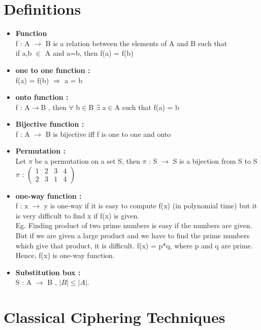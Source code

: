 \documentclass[11pt]{article}
\begin{document}
\section{Definitions}

\begin{itemize}
    \item \textbf{Function}\\
    f : A $\rightarrow$ B is a relation between the elements of A and B such that \\
    if a,b $\in$ A and a=b, then f(a) = f(b)
    \item \textbf{one to one function :}\\
    f(a) = f(b) $\Rightarrow$ a = b
    \item \textbf{onto function :}\\
    f : A$\rightarrow$B , then $\forall$ b$\in$B $\exists$ a$\in$A such that f(a) = b
    \item \textbf{Bijective function :}\\
    f : A $\rightarrow$ B is bijective iff f is one to one and onto
    \item \textbf{Permutation : }\\
    Let $\pi$ be a permutation on a set S, then $\pi$ : S $\rightarrow$ S is a bijection from S to S\\
    $\pi$ : $\begin{pmatrix}
    1 & 2 & 3 & 4\\
    2 & 3 & 1 & 4
    \end{pmatrix}$
    \item \textbf{one-way function :}\\
    f : x $\rightarrow$ y is one-way if it is easy to compute f(x) (in polynomial time) but it is very difficult to find x if f(x) is given.\\
    Eg. Finding product of two prime numbers is easy if the numbers are given. But if we are given a large product and we have to find the prime numbers which give that product, it is difficult.
    f(x) = p*q, where p and q are prime. 
    Hence, f(x) is one-way function. 
    \item \textbf{Substitution box : }\\
    S : A $\rightarrow$ B , $|B| \leq |A|$.
\end{itemize}
\section{Classical Ciphering Techniques}
\end{document}
